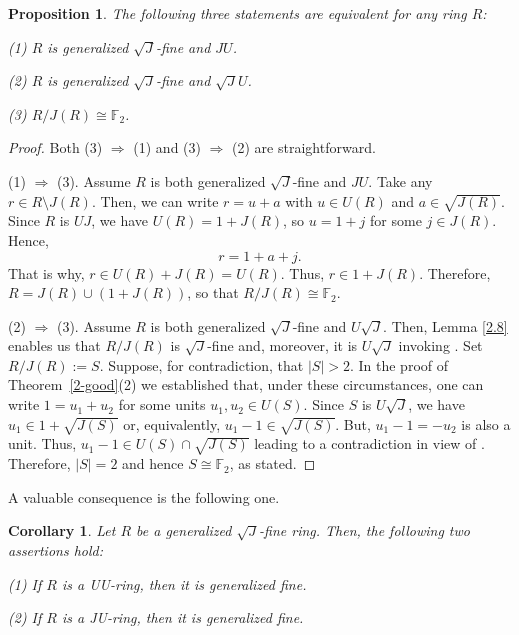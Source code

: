 \documentclass[12pt]{amsart}
\newtheorem{proposition}[theorem]{Proposition}
\newtheorem{corollary}[theorem]{Corollary}
\theoremstyle{definition}
\begin{document}
\begin{proposition}\label{2.15}
The following three statements are equivalent for any ring \(R\):

(1) \(R\) is generalized \(\sqrt{J}\)-fine and \(JU\).

(2) \(R\) is generalized \(\sqrt{J}\)-fine and \(\sqrt{J}U\).

(3) \(R/J(R) \cong \mathbb{F}_2\).
\end{proposition}

\begin{proof}
Both (3) \(\Rightarrow\) (1) and (3) \(\Rightarrow\) (2) are straightforward.
	
(1) \(\Rightarrow\) (3). Assume \(R\) is both generalized \(\sqrt{J}\)-fine and \(JU\). Take any \(r \in R \setminus J(R)\). Then, we can write \(r = u + a\) with \(u \in U(R)\) and \(a \in \sqrt{J(R)}\). Since \(R\) is \(UJ\), we have \(U(R) = 1 + J(R)\), so \(u = 1 + j\) for some \(j \in J(R)\). Hence,
	\[
	r = 1 + a + j.
	\]
That is why, $r\in U(R)+J(R)=U(R)$. Thus, \(r \in 1 + J(R)\). Therefore, \(R = J(R) \cup (1 + J(R))\), so that \(R/J(R) \cong \mathbb{F}_2\).
	
(2) \(\Rightarrow\) (3). Assume \(R\) is both generalized \(\sqrt{J}\)-fine and \(U\sqrt{J}\). Then, Lemma \ref{2.8} enables us that \(R/J(R)\) is \(\sqrt{J}\)-fine and, moreover, it is \(U\sqrt{J}\) invoking \cite[Theoem 2.10]{DDE}. Set $R/J(R):=S$. Suppose, for contradiction, that \(|S| > 2\). In the proof of Theorem~\ref{2-good}(2) we established that, under these circumstances, one can write \(1 = u_1 + u_2\) for some units \(u_1, u_2 \in U(S)\). Since \(S\) is $U\sqrt{J}$, we have \(u_1 \in 1 + \sqrt{J(S)}\) or, equivalently, \(u_1 - 1 \in \sqrt{J(S)}\). But, \(u_1 - 1 = -u_2\) is also a unit. Thus, $u_1-1\in U(S)\cap \sqrt{J(S)}$ leading to a contradiction in view of \cite[Proposition 2.3]{DDE}. Therefore, \(|S| = 2\) and hence \(S \cong \mathbb{F}_2\), as stated.
\end{proof}

A valuable consequence is the following one.

\begin{corollary}\label{2.6}
Let \( R \) be a generalized \(\sqrt{J}\)-fine ring. Then, the following two assertions hold:
	
(1) If \( R \) is a UU-ring, then it is generalized fine.
	
(2) If \( R \) is a JU-ring, then it is generalized fine.
\end{corollary}
\end{document}
